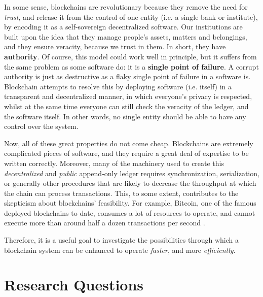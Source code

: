In some sense, blockchains are revolutionary because they remove the need for \textit{trust}, and
release it from the control of one entity (i.e. a single bank or institute), by encoding it as a
self-sovereign decentralized software. Our institutions are built upon the idea that they manage
people's assets, matters and belongings, and they ensure veracity, because we trust in them. In
short, they have \textbf{authority}. Of course, this model could work well in principle, but it
suffers from the same problem as some software do: it is a \textbf{single point of failure}. A
corrupt authority is just as destructive as a flaky single point of failure in a software is.
Blockchain attempts to resolve this by deploying software (i.e. itself) in a transparent and
decentralized manner, in which everyone's privacy is respected, whilst at the same time everyone can
still check the veracity of the ledger, and the software itself. In other words, no single entity
should be able to have any control over the system.

Now, all of these great properties do not come cheap. Blockchains are extremely complicated pieces
of software, and they require a great deal of expertise to be written correctly. Moreover, many of
the machinery used to create this \textit{decentralized} and \textit{public} append-only ledger
requires synchronization, serialization, or generally other procedures that are likely to decrease
the throughput at which the chain can process transactions. This, to some extent, contributes to the
skepticism about blockchains' feasibility. For example, Bitcoin, one of the famous deployed
blockchains to date, consumes a lot of resources to operate, and cannot execute more than around half a dozen transactions per second \cite{security_of_bitcoin}.

Therefore, it is a useful goal to investigate the possibilities through which a blockchain
system can be enhanced to operate \textit{faster}, and more \textit{efficiently}.

\section{Research Questions} \label{chap_intro:sec:resarch_q}

